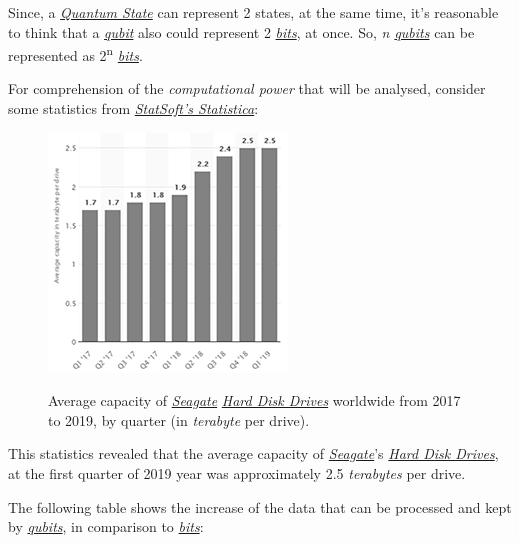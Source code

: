 \documentclass[conference]{IEEEtran}
\begin{document}
Since, a \href{https://en.wikipedia.org/wiki/Quantum_state}{\textit{Quantum State}} can represent 2 states, at the same time, it's reasonable to think that a \href{https://en.wikipedia.org/wiki/Qubit}{\textit{qubit}} also could represent 2 \href{https://en.wikipedia.org/wiki/Bit}{\textit{bits}}, at once. So, \textit{n \href{https://en.wikipedia.org/wiki/Qubit}{qubits}} can be represented as 2\textsuperscript{n} \href{https://en.wikipedia.org/wiki/Bit}{\textit{bits}}.

\newpage

For comprehension of the \textit{computational power} that will be analysed, consider some statistics from \href{http://www.statsoft.com/Products/STATISTICA-Features}{\textit{StatSoft's Statistica}}:

\begin{figure}[htbp]
\centerline{\href{https://www.statista.com/statistics/795748/worldwide-seagate-average-hard-disk-drive-capacity/}{\includegraphics{imgs/fig-6.png}}}
\caption{Average capacity of \href{https://www.seagate.com/}{\textit{Seagate}} \href{https://en.wikipedia.org/wiki/Hard_disk_drive}{\textit{Hard Disk Drives}} worldwide from 2017 to 2019, by quarter (in \textit{terabyte} per drive).}
\label{fig}
\end{figure}

This statistics revealed that the average capacity of \href{https://www.seagate.com/}{\textit{Seagate}}'s \href{https://en.wikipedia.org/wiki/Hard_disk_drive}{\textit{Hard Disk Drives}}, at the first quarter of 2019 year was approximately 2.5 \textit{terabytes} per drive.

\vspace{4pt}

The following table shows the increase of the data that can be processed and kept by \href{https://en.wikipedia.org/wiki/Qubit}{\textit{qubits}}, in comparison to \href{https://en.wikipedia.org/wiki/Bit}{\textit{bits}}:
\end{document}
